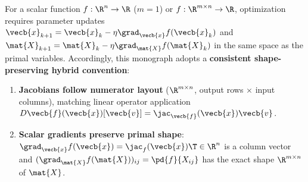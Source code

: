 \documentclass[../../../../master.tex]{subfiles}
\begin{document}
For a scalar function $f : \R^n \to \R$ ($m=1$) or $f : \R^{m \times n} \to \R$,
optimization requires parameter updates $\vecb{x}_{k+1} = \vecb{x}_k - \eta \grad_{\vecb{x}} f(\vecb{x}_k)$
and $\mat{X}_{k+1} = \mat{X}_k - \eta \grad_{\mat{X}} f(\mat{X}_k)$ in the
same space as the primal variables. Accordingly, this monograph adopts a
\textbf{consistent shape-preserving hybrid convention}:
\begin{enumerate}[leftmargin=1.6em]
  \item \textbf{Jacobians follow numerator layout} ($\R^{m \times n}$, output
        rows $\times$ input columns), matching linear operator application
        $D\vecb{f}(\vecb{x})[\vecb{v}] = \jac_{\vecb{f}}(\vecb{x})\vecb{v}$.
  \item \textbf{Scalar gradients preserve primal shape}:
        $\grad_{\vecb{x}} f(\vecb{x}) = \jac_f(\vecb{x})\T \in \R^n$ is a column
        vector and $(\grad_{\mat{X}} f(\mat{X}))_{ij} = \pd{f}{X_{ij}}$ has the
        exact shape $\R^{m \times n}$ of $\mat{X}$.
\end{enumerate}
\end{document}
